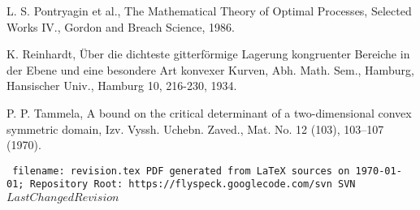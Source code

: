 \documentclass[11pt]{amsart}
\def\svninfo{{\tt
  filename: revision.tex\hfill\break
  PDF generated from LaTeX sources on \today; \hfill\break
  Repository Root: https://flyspeck.googlecode.com/svn \hfill\break
  SVN $LastChangedRevision$
  }
  }
\begin{document}
\begin{thebibliography}{}
 L. S. Pontryagin et al., The Mathematical Theory of Optimal Processes, Selected Works IV., Gordon and Breach Science, 1986.

 K. Reinhardt, \"Uber die dichteste gitterf\"ormige Lagerung
kongruenter Bereiche in der Ebene und eine besondere Art konvexer Kurven, Abh. Math. Sem., Hamburg, Hansischer Univ., Hamburg 10, 216-230, 1934.

 P. P. Tammela, A bound on the critical determinant of a two-dimensional convex symmetric domain,  Izv. Vyssh. Uchebn. Zaved., Mat. No. 12 (103), 103--107 (1970).




\end{thebibliography}

\svninfo
\end{document}
